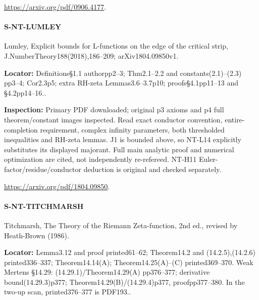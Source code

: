 \documentclass[11pt,a4paper]{article}
\begin{document}
\url{https://arxiv.org/pdf/0906.4177}.

\paragraph{S-NT-LUMLEY} Lumley, Explicit bounds for L-functions on the edge of the critical strip, J.\allowbreak{}NumberTheory188(2018),186–\allowbreak{}209; arXiv1804.\allowbreak{}09850v1.

\textbf{Locator:} Definitions§1.\allowbreak{}1 authorpp2–\allowbreak{}3; Thm2.\allowbreak{}1–\allowbreak{}2.\allowbreak{}2 and constants(2.\allowbreak{}1)–\allowbreak{}(2.\allowbreak{}3) pp3–\allowbreak{}4; Cor2.\allowbreak{}3p5; extra RH-zeta Lemmas3.\allowbreak{}6–\allowbreak{}3.\allowbreak{}7p10; proofs§4.\allowbreak{}1pp11–\allowbreak{}13 and §4.\allowbreak{}2pp14–\allowbreak{}16.\allowbreak{}.

\textbf{Inspection:} Primary PDF downloaded; original p3 axioms and p4 full theorem/\allowbreak{}constant images inspected.\allowbreak{} Read exact conductor convention, entire-completion requirement, complex infinity parameters, both thresholded inequalities and RH-zeta lemmas.\allowbreak{} J1 is bounded above, so NT-L14 explicitly substitutes its displayed majorant.\allowbreak{} Full main analytic proof and numerical optimization are cited, not independently re-refereed.\allowbreak{} NT-H11 Euler-factor/\allowbreak{}residue/\allowbreak{}conductor deduction is original and checked separately.\allowbreak{}

\url{https://arxiv.org/pdf/1804.09850}.

\paragraph{S-NT-TITCHMARSH} Titchmarsh, The Theory of the Riemann Zeta-function, 2nd ed.\allowbreak{}, revised by Heath-Brown (1986).

\textbf{Locator:} Lemma3.\allowbreak{}12 and proof printed61–\allowbreak{}62; Theorem14.\allowbreak{}2 and (14.\allowbreak{}2.\allowbreak{}5),(14.\allowbreak{}2.\allowbreak{}6) printed336–\allowbreak{}337; Theorem14.\allowbreak{}14(A); Theorem14.\allowbreak{}25(A)–\allowbreak{}(C) printed369–\allowbreak{}370.\allowbreak{} Weak Mertens §14.\allowbreak{}29:\allowbreak{} (14.\allowbreak{}29.\allowbreak{}1)/\allowbreak{}Theorem14.\allowbreak{}29(A) pp376–\allowbreak{}377; derivative bound(14.\allowbreak{}29.\allowbreak{}3)p377; Theorem14.\allowbreak{}29(B)/\allowbreak{}(14.\allowbreak{}29.\allowbreak{}4)p377, proofpp377–\allowbreak{}380.\allowbreak{} In the two-up scan, printed376–\allowbreak{}377 is PDF193.\allowbreak{}.
\end{document}
